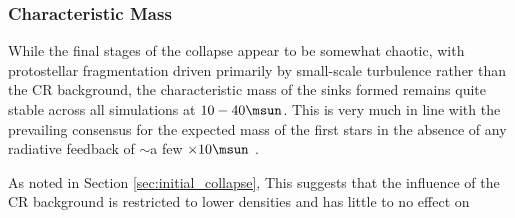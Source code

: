 \subsubsection{Characteristic Mass}

While the final stages of the collapse appear to be somewhat chaotic, with protostellar fragmentation driven primarily by small-scale turbulence rather than the CR background, the characteristic mass of the sinks formed remains quite stable across all simulations at $10-40\msun$.
This is very much in line with the prevailing consensus for the expected mass of the first stars in the absence of any radiative feedback of $\sim$a few $\times10\msun$ \citep{Bromm2013}.  

As noted in Section \ref{sec:initial_collapse}, 
This suggests that the influence of the CR background is restricted to lower densities and has little to no effect on 
